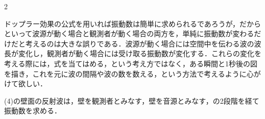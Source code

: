 \setlength{\columnseprule}{0.4pt}
\begin{multicols}{2}
\raggedcolumns

\par\nopagebreak
\begin{sisin}
ドップラー効果の公式を用いれば振動数は簡単に求められるであろうが，だからといって波源が動く場合と観測者が動く場合の両方を，単純に振動数が変わるだけだと考えるのは大きな誤りである．波源が動く場合には空間中を伝わる波の波長が変化し，観測者が動く場合には受け取る振動数が変化する．これらの変化を考える際には，式を当てはめる，という考え方ではなく，{\gtfamily ある瞬間と1秒後の図を描き，これを元に波の間隔や波の数を数える}，という方法で考えるように心がけて欲しい．

(4)の壁面の反射波は，壁を観測者とみなす，壁を音源とみなす，の2段階を経て振動数を求める．


\end{sisin}
\end{multicols}
